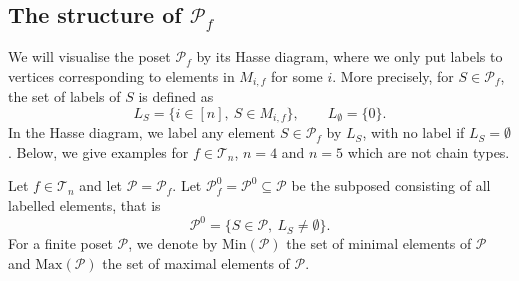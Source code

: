 \documentclass[12pt]{article}
\theoremstyle{definition}
\theoremstyle{remark}
\def\Te{\mathcal T}
\def\Pe{\mathcal P}
\begin{document}
%
%
%
%
%
%


\subsection{The structure of $\Pe_f$}

We will visualise the poset $\Pe_f$ by its Hasse diagram, where we only put labels to
vertices corresponding to elements in $M_{i,f}$ for some $i$. More precisely, for $S\in
\Pe_f$, the set of labels of $S$ is defined as
\[
L_S=\{i\in [n],\ S\in M_{i,f}\},\qquad L_\emptyset=\{0\}.
\]
In the Hasse diagram, we label any element  $S\in \Pe_f$ by  $L_S$, with no label if
$L_S=\emptyset$.  Below, we give examples for $f\in \Te_n$, $n=4$ and
$n=5$ which are not chain types.

Let $f\in \Te_n$ and let $\Pe=\Pe_f$. Let $\Pe_f^0=\Pe^0\subseteq \Pe$ be the subposed consisting
of  all  labelled elements, that is
\[
\Pe^0=\{S\in \Pe, \ L_S\ne \emptyset \}.
\]
For a finite poset $\Pe$, we denote by $\mathrm{Min}(\Pe)$ the set of minimal elements of
$\Pe$ and $\mathrm{Max}(\Pe)$ the set of maximal elements of $\Pe$.
\end{document}
